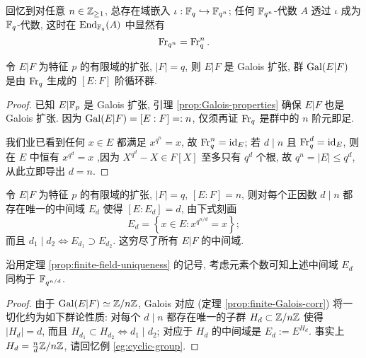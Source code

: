 回忆到对任意 $n \in \mathbb{Z}_{\geq 1}$, 总存在域嵌入 $\iota: \mathbb{F}_q \hookrightarrow \mathbb{F}_{q^n}$; 任何 $\mathbb{F}_{q^n}$-代数 $A$ 透过 $\iota$ 成为 $\mathbb{F}_q$-代数, 这时在 $\operatorname{End}_{\mathbb{F}_q}(A)$ 中显然有
\[ \operatorname{Fr}_{q^n} = \operatorname{Fr}_q^n. \]

\begin{theorem}\label{prop:finite-field-Galois}
	令 $E|F$ 为特征 $p$ 的有限域的扩张, $|F|=q$, 则 $E|F$ 是 Galois 扩张, 群 $\operatorname{Gal}(E|F)$ 是由 $\operatorname{Fr}_q$ 生成的 $[E:F]$ 阶循环群.
\end{theorem}
\begin{proof}
	已知 $E|\mathbb{F}_p$ 是 Galois 扩张, 引理 \ref{prop:Galois-properties} 确保 $E|F$ 也是 Galois 扩张. 因为 $\operatorname{Gal}(E|F) = [E:F] =: n$, 仅须再证 $\operatorname{Fr}_q$ 是群中的 $n$ 阶元即足.

	我们业已看到任何 $x \in E$ 都满足 $x^{q^n}=x$, 故 $\operatorname{Fr}_q^n = \mathrm{id}_E$; 若 $d \mid n$ 且 $\operatorname{Fr}^d_q = \mathrm{id}_E$, 则在 $E$ 中恒有 $x^{q^d}=x$ ,因为 $X^{q^d}-X \in F[X]$ 至多只有 $q^d$ 个根, 故 $q^n = |E| \leq q^d$, 从此立即导出 $d=n$.
\end{proof}

\begin{theorem}\label{prop:finite-field-subext}
	令 $E|F$ 为特征 $p$ 的有限域的扩张, $|F|=q$, $[E:F]=n$, 则对每个正因数 $d \mid n$ 都存在唯一的中间域 $E_d$ 使得 $[E:E_d] = d$, 由下式刻画
	\[ E_d = \left\{ x \in E: x^{q^{n/d}} = x \right\}; \]
	而且 $d_1 \mid d_2 \iff E_{d_1} \supset E_{d_2}$. 这穷尽了所有 $E|F$ 的中间域.
\end{theorem}
沿用定理 \ref{prop:finite-field-uniqueness} 的记号, 考虑元素个数可知上述中间域 $E_d$ 同构于 $\mathbb{F}_{q^{n/d}}$.
\begin{proof}
	由于 $\operatorname{Gal}(E|F) \simeq \mathbb{Z}/n\mathbb{Z}$, Galois 对应 (定理 \ref{prop:finite-Galois-corr}) 将一切化约为如下群论性质: 对每个 $d \mid n$ 都存在唯一的子群 $H_d \subset \mathbb{Z}/n\mathbb{Z}$ 使得 $|H_d| = d$, 而且 $H_{d_1} \subset H_{d_2} \iff d_1 \mid d_2$; 对应于 $H_d$ 的中间域是 $E_d := E^{H_d}$. 事实上 $H_d = \frac{n}{d}\mathbb{Z} / n\mathbb{Z}$, 请回忆例 \ref{eg:cyclic-group}.
\end{proof}

